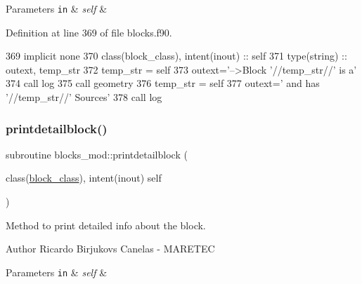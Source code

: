 \begin{DoxyParams}[1]{Parameters}
\mbox{\tt in}  & {\em self} & \\
\hline
\end{DoxyParams}


Definition at line 369 of file blocks.\+f90.


\begin{DoxyCode}
369     \textcolor{keywordtype}{implicit none}
370     \textcolor{keywordtype}{class}(block\_class), \textcolor{keywordtype}{intent(inout)} :: self
371     \textcolor{keywordtype}{type}(string) :: outext, temp\_str
372     temp\_str = self%
373     outext=\textcolor{stringliteral}{'-->Block '}//temp\_str//\textcolor{stringliteral}{' is a'}
374     \textcolor{keyword}{call }log%
375     \textcolor{keyword}{call }geometry%
376     temp\_str = self%
377     outext=\textcolor{stringliteral}{'      and has '}//temp\_str//\textcolor{stringliteral}{' Sources'}
378     \textcolor{keyword}{call }log%
\end{DoxyCode}
\mbox{\label{namespaceblocks__mod_a10f356706988c45a255922fe70851488}} 
\subsubsection{\texorpdfstring{printdetailblock()}{printdetailblock()}}
{\footnotesize\ttfamily subroutine blocks\+\_\+mod\+::printdetailblock (\begin{DoxyParamCaption}\item[{class(\mbox{\hyperlink{structblocks__mod_1_1block__class}{block\+\_\+class}}), intent(inout)}]{self }\end{DoxyParamCaption})\hspace{0.3cm}{\ttfamily [private]}}



Method to print detailed info about the block. 

\begin{DoxyAuthor}{Author}
Ricardo Birjukovs Canelas -\/ M\+A\+R\+E\+T\+EC 
\end{DoxyAuthor}

\begin{DoxyParams}[1]{Parameters}
\mbox{\tt in}  & {\em self} & \\
\hline
\end{DoxyParams}


